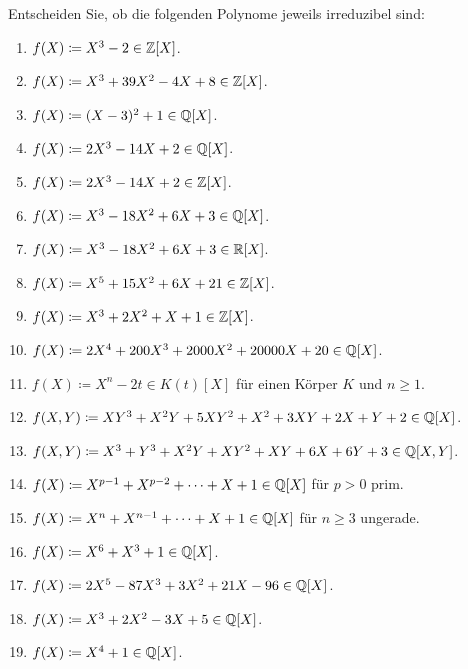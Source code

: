 \begin{question}[subtitle = Irreduziblität von Polynomen]
  \label{question: irreducibility of polynomials}
  Entscheiden Sie, ob die folgenden Polynome jeweils irreduzibel sind:
  \begin{enumerate}
    \item
      $f(X) \coloneqq X^3 - 2 \in \mathbb{Z}[X]$.
    \item
      $f(X) \coloneqq X^3 + 39 X^2 - 4X + 8 \in \mathbb{Z}[X]$.
    \item
      $f(X) \coloneqq (X - 3)^2 + 1 \in \mathbb{Q}[X]$.
    \item
      $f(X) \coloneqq 2X^3 - 14X + 2 \in \mathbb{Q}[X]$.
    \item
      $f(X) \coloneqq 2X^3 - 14X + 2 \in \mathbb{Z}[X]$.
    \item
      $f(X) \coloneqq X^3 - 18 X^2 + 6 X + 3 \in \mathbb{Q}[X]$.
    \item
      $f(X) \coloneqq X^3 - 18 X^2 + 6 X + 3 \in \mathbb{R}[X]$.
    \item
      $f(X) \coloneqq X^5 + 15 X^2 + 6 X + 21 \in \mathbb{Z}[X]$.
    \item
      $f(X) \coloneqq X^3 + 2 X^2 + X + 1 \in \mathbb{Z}[X]$.
    \item
      $f(X) \coloneqq 2X^4 + 200 X^3 + 2000 X^2 + 20000 X + 20 \in \mathbb{Q}[X]$.
    \item
      $f(X) \coloneqq  X^n - 2t \in K(t)[X]$ für einen Körper $K$ und $n \geq 1$.
    \item
      $f(X,Y) \coloneqq X Y^3 + X^2 Y + 5 X Y^2 + X^2 + 3 X Y + 2 X + Y + 2 \in \mathbb{Q}[X]$.
    \item
      $f(X,Y) \coloneqq X^3 + Y^3 + X^2 Y + X Y^2 + XY + 6 X + 6 Y + 3 \in \mathbb{Q}[X,Y]$.
    \item
      $f(X) \coloneqq X^{p-1} + X^{p-2} + \dotsb + X + 1 \in \mathbb{Q}[X]$ für $p > 0$ prim.
    \item
      $f(X) \coloneqq X^n + X^{n-1} + \dotsb + X + 1 \in \mathbb{Q}[X]$ für $n \geq 3$ ungerade.
    \item
      $f(X) \coloneqq X^6 + X^3 + 1 \in \mathbb{Q}[X]$.
    \item
      $f(X) \coloneqq 2 X^5  - 87 X^3 + 3 X^2 + 21 X - 96 \in \mathbb{Q}[X]$.
    \item
      $f(X) \coloneqq X^3 + 2 X^2 - 3 X + 5 \in \mathbb{Q}[X]$.
    \item
      $f(X) \coloneqq X^4 + 1 \in \mathbb{Q}[X]$.
  \end{enumerate}
\end{question}


